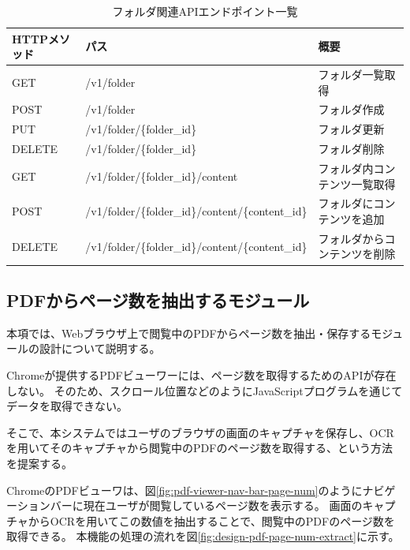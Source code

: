 \begin{table}[htbp]
  \label{tb:design-folder-api}
  \caption{フォルダ関連APIエンドポイント一覧}
  \begin{center}
    \begin{tabular}{|l|l|l|}
      \hline
      HTTPメソッド & パス & 概要 \\\hline\hline
      GET & /v1/folder & フォルダ一覧取得 \\\hline
      POST & /v1/folder & フォルダ作成 \\\hline
      PUT & /v1/folder/\{folder\_id\} & フォルダ更新 \\\hline
      DELETE & /v1/folder/\{folder\_id\} & フォルダ削除 \\\hline
      GET & /v1/folder/\{folder\_id\}/content & フォルダ内コンテンツ一覧取得 \\\hline
      POST & /v1/folder/\{folder\_id\}/content/\{content\_id\} & フォルダにコンテンツを追加 \\\hline
      DELETE & /v1/folder/\{folder\_id\}/content/\{content\_id\} & フォルダからコンテンツを削除 \\\hline
    \end{tabular}
  \end{center}
\end{table}

\subsection{PDFからページ数を抽出するモジュール}
本項では、Webブラウザ上で閲覧中のPDFからページ数を抽出・保存するモジュールの設計について説明する。

Chromeが提供するPDFビューワーには、ページ数を取得するためのAPIが存在しない。
そのため、スクロール位置などのようにJavaScriptプログラムを通じてデータを取得できない。

そこで、本システムではユーザのブラウザの画面のキャプチャを保存し、OCRを用いてそのキャプチャから閲覧中のPDFのページ数を取得する、という方法を提案する。

ChromeのPDFビューワは、図\ref{fig:pdf-viewer-nav-bar-page-num}のようにナビゲーションバーに現在ユーザが閲覧しているページ数を表示する。
画面のキャプチャからOCRを用いてこの数値を抽出することで、閲覧中のPDFのページ数を取得できる。
本機能の処理の流れを図\ref{fig:design-pdf-page-num-extract}に示す。

